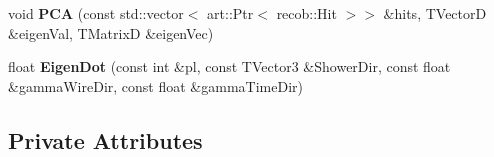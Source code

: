 \begin{DoxyCompactItemize}
\item 
\hypertarget{classSecondShowerPurity_a57fd30974ec2f17538f54fbeaeb6f8ef}{void {\bfseries P\-C\-A} (const std\-::vector$<$ art\-::\-Ptr$<$ recob\-::\-Hit $>$$>$ \&hits, T\-Vector\-D \&eigen\-Val, T\-Matrix\-D \&eigen\-Vec)}\label{classSecondShowerPurity_a57fd30974ec2f17538f54fbeaeb6f8ef}

\item 
\hypertarget{classSecondShowerPurity_a7b112eddad9439ca96b2d25ce2e432b2}{float {\bfseries Eigen\-Dot} (const int \&pl, const T\-Vector3 \&Shower\-Dir, const float \&gamma\-Wire\-Dir, const float \&gamma\-Time\-Dir)}\label{classSecondShowerPurity_a7b112eddad9439ca96b2d25ce2e432b2}

\end{DoxyCompactItemize}
\subsection*{Private Attributes}
